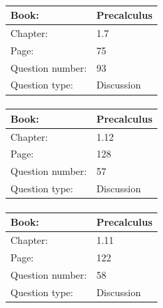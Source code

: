 \documentclass{article}
\begin{document}
            \paragraph{}
            \begin{tabularx}{1\textwidth}{
                    p{}
                    p{}
                }
                \toprule
                Book: & Precalculus
                \\
                \midrule
                Chapter: & 1.7
                \\
                \midrule
                Page: & 75
                \\
                \midrule
                Question number: & 93
                \\
                \midrule
                Question type: & Discussion
                \\
                \bottomrule
            \end{tabularx}
            
            \paragraph{}
            \begin{tabularx}{1\textwidth}{
                    p{}
                    p{}
                }
                \toprule
                Book: & Precalculus
                \\
                \midrule
                Chapter: & 1.12
                \\
                \midrule
                Page: & 128
                \\
                \midrule
                Question number: & 57
                \\
                \midrule
                Question type: & Discussion
                \\
                \bottomrule
            \end{tabularx}
            
            \paragraph{}
            \begin{tabularx}{1\textwidth}{
                    p{}
                    p{}
                }
                \toprule
                Book: & Precalculus
                \\
                \midrule
                Chapter: & 1.11
                \\
                \midrule
                Page: & 122
                \\
                \midrule
                Question number: & 58
                \\
                \midrule
                Question type: & Discussion
                \\
                \bottomrule
            \end{tabularx}
            
\end{document}
